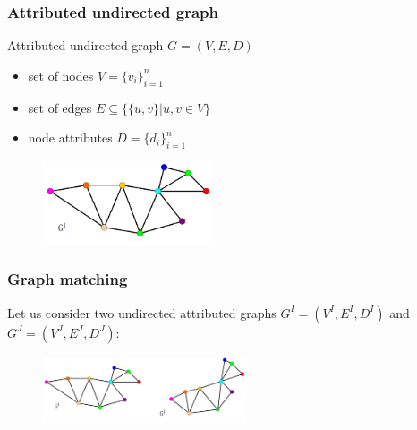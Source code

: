 \documentclass[hyperref={pdfpagelabels=false}]{beamer}
\begin{document}
\begin{frame}
\frametitle{Attributed undirected graph}
Attributed undirected graph $G=(V,E,D)$
\begin{itemize}
\item set of nodes $V=\{v_i\}_{i=1}^{n}$
\item set of edges $E\subseteq\{\{u,v\}| u, v\in V\}$
\item node attributes $D=\{d_i\}_{i=1}^{n}$
\end{itemize}
\vspace{1cm}
\begin{figure}[b]
    \centering
    \includegraphics[width=5cm]{fig/at_graph_1.pdf}
\end{figure}%
\end{frame}
\begin{frame}
\frametitle{Graph matching}
Let us consider two undirected attributed graphs $G^I = (V^I, E^I, D^I)$ and $G^J = (V^J, E^J,D^J)$: %
\begin{figure}[h]
        \centering
        \includegraphics[width=6cm]{fig/graphs_12.pdf}
\end{figure}
\end{frame}
\end{document}
